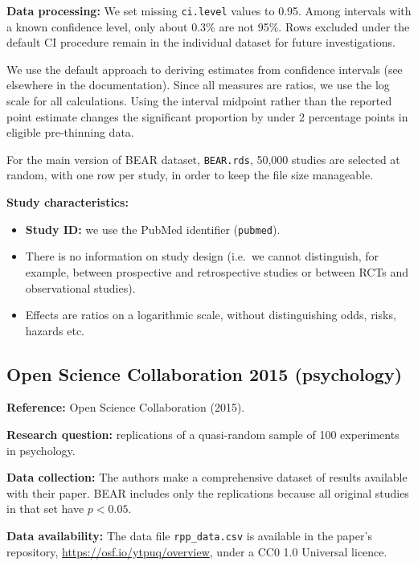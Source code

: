 \documentclass[
  11pt,
]{article}
\providecommand{\tightlist}{%
  \setlength{\itemsep}{0pt}\setlength{\parskip}{0pt}}
\begin{document}
\textbf{Data processing:} We set missing \texttt{ci.level} values to
0.95. Among intervals with a known confidence level, only about 0.3\%
are not 95\%. Rows excluded under the default CI procedure remain in the
individual dataset for future investigations.

We use the default approach to deriving estimates from confidence
intervals (see elsewhere in the documentation). Since all measures are
ratios, we use the log scale for all calculations. Using the interval
midpoint rather than the reported point estimate changes the significant
proportion by under 2 percentage points in eligible pre-thinning data.

For the main version of BEAR dataset, \texttt{BEAR.rds}, 50,000 studies
are selected at random, with one row per study, in order to keep the
file size manageable.

\textbf{Study characteristics:}

\begin{itemize}
\tightlist
\item
  \textbf{Study ID:} we use the PubMed identifier (\texttt{pubmed}).
\item
  There is no information on study design (i.e.~we cannot distinguish,
  for example, between prospective and retrospective studies or between
  RCTs and observational studies).
\item
  Effects are ratios on a logarithmic scale, without distinguishing
  odds, risks, hazards etc.
\end{itemize}

\newpage

\subsection{Open Science Collaboration 2015
(psychology)}\label{open-science-collaboration-2015-psychology}

\textbf{Reference:} Open Science Collaboration (2015).

\textbf{Research question:} replications of a quasi-random sample of 100
experiments in psychology.

\textbf{Data collection:} The authors make a comprehensive dataset of
results available with their paper. BEAR includes only the replications
because all original studies in that set have \(p < 0.05\).

\textbf{Data availability:} The data file \texttt{rpp\_data.csv} is
available in the paper's repository,
\url{https://osf.io/ytpuq/overview}, under a CC0 1.0 Universal licence.
\end{document}
